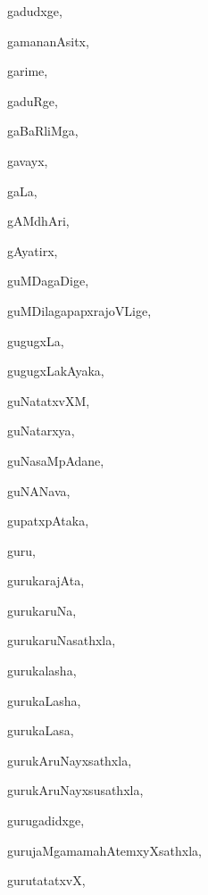 \begin{multicols}{3}
{\noindent
{gadudxge}, \pageref{gadudxge}

\noindent
{gamananAsitx}, \pageref{gamananAsitx}

\noindent
{garime}, \pageref{garime}

\noindent
{gaduRge}, \pageref{gaduRge}

\noindent
{gaBaRliMga}, \pageref{gaBaRliMga}

\noindent
{gavayx}, \pageref{gavayx}

\noindent
{gaLa}, \pageref{gaLa}

\noindent
{gAMdhAri}, \pageref{gAMdhAri}

\noindent
{gAyatirx}, \pageref{gAyatirx}

\noindent
{guMDagaDige}, \pageref{guMDagaDige}

\noindent
{guMDilagapapxrajoVLige}, \pageref{guMDilagapapxrajoVLige}

\noindent
{gugugxLa}, \pageref{gugugxLa}

\noindent
{gugugxLakAyaka}, \pageref{gugugxLakAyaka}

\noindent
{guNatatxvXM}, \pageref{guNatatxvXM}

\noindent
{guNatarxya}, \pageref{guNatarxya}

\noindent
{guNasaMpAdane}, \pageref{guNasaMpAdane}

\noindent
{guNANava}, \pageref{guNANava}

\noindent
{gupatxpAtaka}, \pageref{gupatxpAtaka}

\noindent
{guru}, \pageref{guru}

\noindent
{gurukarajAta}, \pageref{gurukarajAta}

\noindent
{gurukaruNa}, \pageref{gurukaruNa}

\noindent
{gurukaruNasathxla}, \pageref{gurukaruNasathxla}

\noindent
{gurukalasha}, \pageref{gurukalasha}

\noindent
{gurukaLasha}, \pageref{gurukaLasha}

\noindent
{gurukaLasa}, \pageref{gurukaLasa}

\noindent
{gurukAruNayxsathxla}, \pageref{gurukAruNayxsathxla}

\noindent
{gurukAruNayxsusathxla}, \pageref{gurukAruNayxsusathxla}

\noindent
{gurugadidxge}, \pageref{gurugadidxge}

\noindent
{gurujaMgamamahAtemxyXsathxla}, \pageref{gurujaMgamamahAtemxyXsathxla}

\noindent
{gurutatatxvX}, \pageref{gurutatatxvX}

}
\end{multicols}
